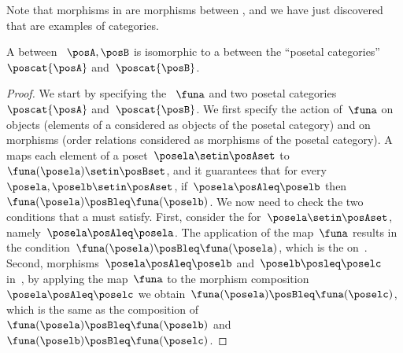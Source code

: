 

Note that morphisms in \Pos are morphisms between , and we have just discovered that  are examples of categories.
\begin{lemma}
    \label{lem:posetfunctor}
    A  between ~$\posA,\posB$ is isomorphic to a  between the ``posetal categories''~$\poscat{\posA}$ and~$\poscat{\posB}$.
\end{lemma}
\begin{proof}
    We start by specifying the ~$\funa$ and two posetal categories~$\poscat{\posA}$ and~$\poscat{\posB}$.
    We first specify the action of~$\funa$ on objects (elements of a  considered as objects of the posetal category) and on morphisms (order relations considered as morphisms of the posetal category).
    A  maps each element of a poset~$\posela\setin \posAset$ to~$\funa(\posela) \setin \posBset$, and it guarantees that for every~$\posela,\poselb\setin \posAset$, if~$\posela\posAleq \poselb$ then~$\funa(\posela)\posBleq \funa(\poselb)$.
    We now need to check the two conditions that a  must satisfy.
    First, consider the  for~$\posela\setin \posAset$, namely~$\posela \posAleq \posela$.
    The application of the map~$\funa$ results in the condition~$\funa(\posela)\posBleq \funa(\posela)$, which is the  on~\posB.
    Second, morphisms~$\posela\posAleq \poselb$ and~$\poselb\posleq \poselc$ in~\posA, by applying the map~$\funa$ to the morphism composition~$\posela\posAleq \poselc$ we obtain~$\funa(\posela)\posBleq \funa(\poselc)$, which is the same as the composition of~$\funa(\posela)\posBleq \funa(\poselb)$ and~$\funa(\poselb)\posBleq \funa(\poselc)$.
\end{proof}

